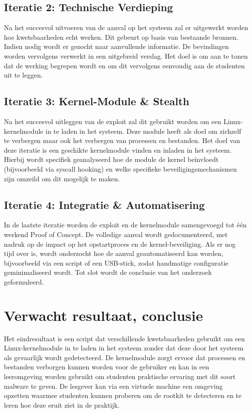 \subsection{Iteratie 2: Technische Verdieping}
Na het succesvol uitvoeren van de aanval op het systeem zal er uitgewerkt worden hoe kwetsbaarheden echt werken. Dit gebeurt op basis van bestaande bronnen. Indien nodig wordt er gezocht naar aanvullende informatie. De bevindingen worden vervolgens verwerkt in een uitgebreid verslag. Het doel is om aan te tonen dat de werking begrepen wordt en om dit vervolgens eenvoudig aan de studenten uit te leggen.

\subsection{Iteratie 3: Kernel-Module & Stealth}
Na het succesvol uitleggen van de exploit zal dit gebruikt worden om een Linux-kernelmodule in te laden in het systeem. Deze module heeft als doel om zichzelf te verbergen maar ook het verbergen van processen en bestanden. Het doel van deze iteratie is een geschikte kernelmodule vinden en inladen in het systeem. Hierbij wordt specifiek geanalyseerd hoe de module de kernel beïnvloedt (bijvoorbeeld via syscall hooking) en welke specifieke beveiligingsmechanismen zijn omzeild om dit mogelijk te maken.


\subsection{Iteratie 4: Integratie & Automatisering}
In de laatste iteratie worden de exploit en de kernelmodule samengevoegd tot één werkend Proof of Concept. De volledige aanval wordt gedocumenteerd, met nadruk op de impact op het opstartproces en de kernel-beveiliging. Als er nog tijd over is, wordt onderzocht hoe de aanval geautomatiseerd kan worden, bijvoorbeeld via een script of een USB-stick, zodat handmatige configuratie geminimaliseerd wordt. Tot slot wordt de conclusie van het onderzoek geformuleerd.


\section{Verwacht resultaat, conclusie}%
\label{sec:verwachte_resultaten}

Het eindresultaat is een script dat verschillende kwetsbaarheden gebruikt om een 
Linux-kernelmodule in te laden in het systeem zonder dat deze door het systeem als gevaarlijk wordt gedetecteerd. 
De kernelmodule zorgt ervoor dat processen en bestanden verborgen kunnen worden voor de gebruiker en kan in een leeromgeving worden gebruikt om studenten praktische ervaring met dit soort malware te geven. De lesgever kan via een virtuele machine een omgeving opzetten waarmee studenten kunnen proberen om de rootkit te detecteren en te leren hoe deze eruit ziet in de praktijk.

